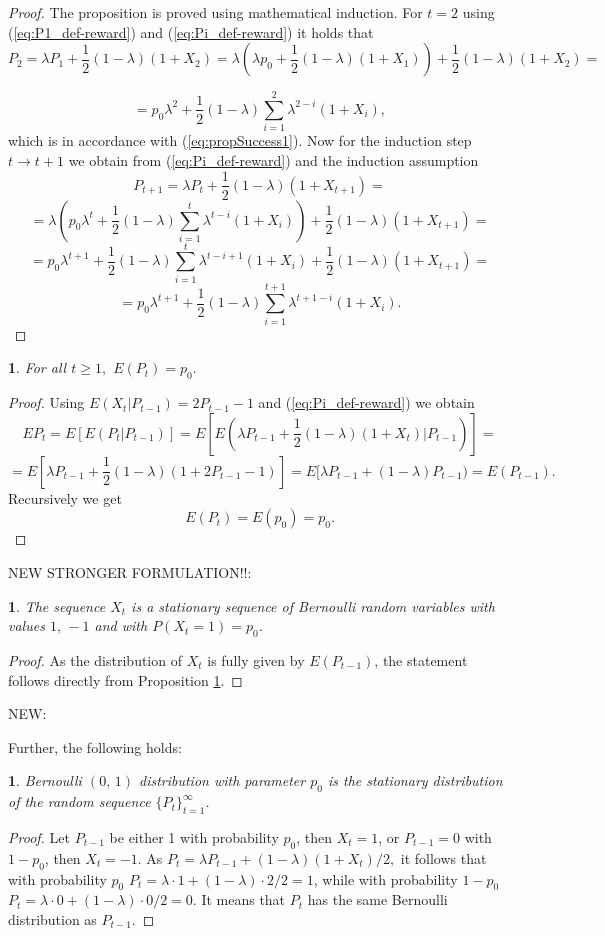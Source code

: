\documentclass{amsart}
\theoremstyle{definition}
\theoremstyle{plain}
\newtheorem{prop}[thm]{\protect\propositionname}
\theoremstyle{plain}
\theoremstyle{plain}
\numberwithin{equation}{section}
\providecommand{\propositionname}{Proposition}
\begin{document}
\begin{proof}
The proposition is proved using mathematical induction. For $t=2$ using (\ref{eq:P1_def-reward})
and (\ref{eq:Pi_def-reward}) it holds that
\[
P_{2}=\lambda P_{1}+\frac{1}{2}(1-\lambda)(1+X_{2})=\lambda(\lambda p_{0}+\frac{1}{2}(1-\lambda)(1+X_{1}))+\frac{1}{2}(1-\lambda)(1+X_{2})=
\]

\[
=p_{0}\lambda^{2}+\frac{1}{2}(1-\lambda)\sum_{i=1}^{2}\lambda^{2-i}(1+X_{i}),
\]
which is in accordance with (\ref{eq:propSuccess1}). Now for the
induction step $t\rightarrow t+1$ we obtain from (\ref{eq:Pi_def-reward})
and the induction assumption
\[
P_{t+1}=\lambda P_{t}+\frac{1}{2}(1-\lambda)(1+X_{t+1})=
\]
\[
=\lambda(p_{0}\lambda^{t}+\frac{1}{2}(1-\lambda)\sum_{i=1}^{t}\lambda^{t-i}(1+X_{i}))+\frac{1}{2}(1-\lambda)(1+X_{t+1})=
\]
\[
=p_{0}\lambda^{t+1}+\frac{1}{2}(1-\lambda)\sum_{i=1}^{t}\lambda^{t-i+1}(1+X_{i})+\frac{1}{2}(1-\lambda)(1+X_{t+1})=
\]
\[
=p_{0}\lambda^{t+1}+\frac{1}{2}(1-\lambda)\sum_{i=1}^{t+1}\lambda^{t+1-i}(1+X_{i}).
\]
\end{proof}

\begin{prop}
\label{PropReward2}For all $t\geq1,$ $E(P_{t})=p_{0}.$
\end{prop}
\begin{proof}
Using $E(X_{t}|P_{t-1})=2P_{t-1}-1$ and (\ref{eq:Pi_def-reward})
we obtain
\[
EP_{t}=E[E(P_{t}|P_{t-1})]=E[E(\lambda P_{t-1}+\frac{1}{2}(1-\lambda)(1+X_{t})|P_{t-1})]=
\]
\[
=E[\lambda P_{t-1}+\frac{1}{2}(1-\lambda)(1+2P_{t-1}-1)]=E[\lambda P_{t-1}+(1-\lambda)P_{t-1})=  E(P_{t-1}).
\]
Recursively we get
\begin{equation}
E(P_{t})=E(p_{0})=p_{0}.\label{eq:EPt-reward-formula}
\end{equation}
\end{proof}

NEW STRONGER FORMULATION!!:

\begin{prop}
The sequence $X_t$ is a stationary sequence of Bernoulli random
variables with values $1,\,-1$ and with $P(X_t=1)=p_0$.
\end{prop}
\begin{proof}
As the distribution of $X_t$ is fully given by $E(P_{t-1})$, the
statement follows directly from Proposition \ref{PropReward2}.
\end{proof}

NEW:

Further, the following holds:

\begin{prop}
Bernoulli $(0,\,1)$ distribution with parameter $p_0$ is the stationary distribution of the random sequence
${\{P_{t}\}}_{t=1}^{\infty}$.
\end{prop}
\begin{proof}
Let $P_{t-1}$ be either 1 with probability $p_0$, then $X_t=1$, or
$P_{t-1}=0$ with $1-p_0$, then $X_t=-1$.  As $P_t=\lambda
P_{t-1}+(1-\lambda)(1+X_t)/2,$ it follows that with probability
$p_0$ $P_t=\lambda\cdot 1+(1-\lambda)\cdot 2/2=1$, while with
probability $1-p_0$ $P_t=\lambda\cdot 0+(1-\lambda)\cdot 0/2=0$.
It means that $P_t$ has the same Bernoulli distribution as
$P_{t-1}$.
\end{proof}
\end{document}
